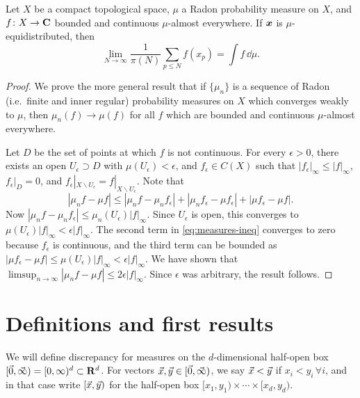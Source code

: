 \begin{theorem}
Let $X$ be a compact topological space, $\mu$ a Radon probability measure on 
$X$, and $f\colon X\to \mathbf{C}$ bounded and continuous $\mu$-almost everywhere. If 
${\boldsymbol x}$ is $\mu$-equidistributed, then 
\[
	\lim_{N\to \infty} \frac{1}{\pi(N)} \sum_{p\leqslant N} f(x_p) = \int f\, \dd\mu .
\]
\end{theorem}
\begin{proof}
We prove the more general result that if $\{\mu_n\}$ is a sequence of Radon 
(i.e.~finite and inner regular)
probability measures on $X$ which converges weakly to $\mu$, then 
$\mu_n(f) \to \mu(f)$ for all $f$ which are bounded and continuous 
$\mu$-almost everywhere. 

Let $D$ be the set of points at which $f$ is not continuous. For every 
$\epsilon>0$, there exists an open $U_\epsilon\supset D$ with 
$\mu(U_\epsilon) < \epsilon$, and $f_\epsilon\in C(X)$ such that 
$|f_\epsilon|_\infty \leqslant |f|_\infty$, $f_\epsilon|_D = 0$, and 
$f_\epsilon|_{X\smallsetminus U_\epsilon} = f|_{X\smallsetminus U_\epsilon}$. 
Note that 
\begin{equation}\label{eq:measures-ineq}
	|\mu_n f - \mu f| \leqslant |\mu_n f - \mu_n f_\epsilon| + |\mu_n f_\epsilon - \mu f_\epsilon| + |\mu f_\epsilon - \mu f| .
\end{equation}
Now $|\mu_n f - \mu_n f_\epsilon| \leqslant \mu_n(U_\epsilon) |f|_\infty$. Since 
$U_\epsilon$ is open, this converges to 
$\mu(U_\epsilon) |f|_\infty < \epsilon |f|_\infty$. The second term in 
\eqref{eq:measures-ineq} converges to zero because $f_\epsilon$ is continuous, 
and the third term can be bounded as 
$|\mu f_\epsilon - \mu f| \leqslant \mu(U_\epsilon) |f|_\infty < \epsilon |f|_\infty$. 
We have shown that 
$\limsup_{n\to \infty} |\mu_n f - \mu f| \leqslant 2 \epsilon |f|_\infty$. 
Since $\epsilon$ was arbitrary, the result follows. 
\end{proof}





\section{Definitions and first results}

We will define discrepancy for measures on the $d$-dimensional half-open box 
$[\vec{0},\vec{\infty}) = [0,\infty)^d\subset \mathbf{R}^d$. For vectors 
$\vec{x},\vec{y}\in [\vec{0},\vec{\infty})$, we say $\vec{x}<\vec{y}$ if $x_i<y_i\,\forall i$, and 
in that case write $[\vec{x},\vec{y})$ for the half-open box 
$[x_1,y_1)\times \cdots \times [x_d,y_d)$. 

